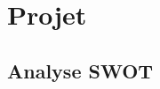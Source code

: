 \section{Projet}
	
	
\def\slp{XXX }
	
\newcommand{\nb}[3]{
	{{\bfseries\sffamily\tiny\textcolor{white}{#1}}}
	{\textcolor{#2}{\sf\small$\blacktriangleright$\textit{#3}$\blacktriangleleft$}}
	}
	

\newcommand{\OP}[1]{\textcolor{olive}{\sf\small$\blacktriangleright$ \textbf{OP:} \textit{#1} $\blacktriangleleft$}}




	
		\subsection{Analyse SWOT}
		 
		 \renewcommand{\labelitemi}{$\bullet$}
		 


